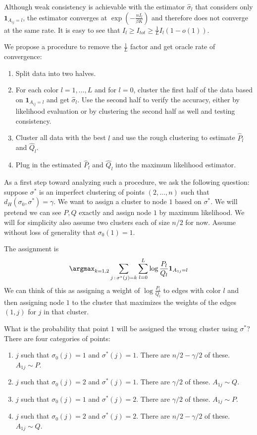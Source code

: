 \documentclass{article}
\begin{document}
Although weak consistency is achievable with the estimator $\hat{\sigma}_l$ that considers only $\mathbf{1}_{A_{ij} = l}$, the estimator converges at $\exp( - \frac{n I_l}{\beta K})$ and therefore does not converge at the same rate. It is easy to see that $I_l \geq I_{tot} \geq \frac{1}{L} I_l (1 - o(1))$. 

We propose a procedure to remove the $\frac{1}{L}$ factor and get oracle rate of convergence:

\begin{enumerate}
\item Split data into two halves. 
\item For each color $l=1,...,L$ and for $l=0$, cluster the first half of the data based on $\mathbf{1}_{A_{ij} = l}$ and get $\hat{\sigma}_l$. Use the second half to verify the accuracy, either by likelihood evaluation or by clustering the second half as well and testing consistency.
\item Cluster all data with the best $l$ and use the rough clustering to estimate $\hat{P}_l$ and $\hat{Q}_l$. 
\item Plug in the estimated $\hat{P}_l$ and $\hat{Q}_l$ into the maximum likelihood estimator.
\end{enumerate}

As a first step toward analyzing such a procedure, we ask the following question: suppose $\sigma^*$ is an imperfect clustering of points $(2,...,n)$ such that $d_H(\sigma_0, \sigma^*) = \gamma$. We want to assign a cluster to node $1$ based on $\sigma^*$. We will pretend we can see $P, Q$ exactly and assign node $1$ by maximum likelihood. We will for simplicity also assume two clusters each of size $n/2$ for now. Assume without loss of generality that $\sigma_0(1) = 1$. 

The assignment is
\[
\argmax_{k = 1,2} \sum_{j \,:\, \sigma^*(j) = k} \sum_{l=0}^L \log \frac{P_l}{Q_l} \mathbf{1}_{A_{1j}= l}
\]
We can think of this as assigning a weight of $\log \frac{P_l}{Q_l}$ to edges with color $l$ and then assigning node $1$ to the cluster that maximizes the weights of the edges $(1,j)$ for $j$ in that cluster. 

What is the probability that point $1$ will be assigned the wrong cluster using $\sigma^*$? There are four categories of points: 
\begin{enumerate}
\item $j$ such that $\sigma_0(j) = 1$ and $\sigma^*(j) = 1$. There are $n/2 -\gamma/2$ of these. $A_{1j} \sim P$. 
\item $j$ such that $\sigma_0(j) = 2$ and $\sigma^*(j) = 1$. There are $\gamma/2$ of these. $A_{1j} \sim Q$. 
\item  $j$ such that $ \sigma_0(j)= 1$ and $\sigma^*(j) = 2$. There are $\gamma/2$ of these. $A_{1j} \sim P$. 
\item  $j$ such that $\sigma_0(j) = 2$ and $\sigma^*(j) = 2$. There are $n/2 - \gamma/2 $ of these. $A_{1j} \sim Q$. 
\end{enumerate} 
\end{document}
